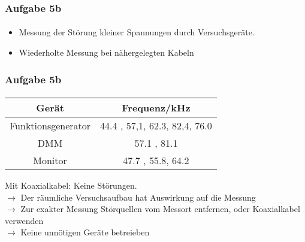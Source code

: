 \begin{frame}
\frametitle{Aufgabe 5b}
\framesubtitle{}
    \begin{itemize}
        \item Messung der Störung kleiner Spannungen durch Versuchsgeräte.
        \item Wiederholte Messung bei nähergelegten Kabeln
    \end{itemize}
\end{frame}
\begin{frame}
\frametitle{Aufgabe 5b}
\framesubtitle{}
\begin{center}
    \begin{tabular}{c|c}
        Gerät & Frequenz/kHz \\
        \hline
        Funktionsgenerator & 44.4 , 57,1, 62.3, 82,4, 76.0 \\
        DMM & 57.1 , 81.1 \\
        Monitor& 47.7 , 55.8, 64.2
    \end{tabular}

Mit Koaxialkabel: Keine Störungen. \\
$\rightarrow$  Der räumliche Versuchsaufbau hat Auswirkung auf die Messung \\
$\rightarrow$  Zur exakter Messung Störquellen vom Messort entfernen, oder
Koaxialkabel verwenden \\
$\rightarrow$ Keine unnötigen Geräte betreieben
\end{center}
\end{frame}
